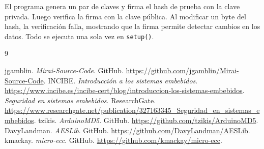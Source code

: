 \documentclass[12pt,a4paper]{article}
\begin{document}
El programa genera un par de claves y firma el hash de prueba con la clave privada. Luego verifica la firma con la clave pública. Al modificar un byte del hash, la verificación falla, mostrando que la firma permite detectar cambios en los datos. Todo se ejecuta una sola vez en \texttt{setup()}.


\newpage
\renewcommand{\refname}{Referencias}
\begin{thebibliography}{9}
 jgamblin. \textit{Mirai-Source-Code}. GitHub.
\url{https://github.com/jgamblin/Mirai-Source-Code}.
 INCIBE. \textit{Introducción a los sistemas embebidos}.
\url{https://www.incibe.es/incibe-cert/blog/introduccion-los-sistemas-embebidos}.
 \textit{Seguridad en sistemas embebidos}. ResearchGate.
\url{https://www.researchgate.net/publication/327163345_Seguridad_en_sistemas_embebidos}.
 tzikis. \textit{ArduinoMD5}. GitHub.
\url{https://github.com/tzikis/ArduinoMD5}.
 DavyLandman. \textit{AESLib}. GitHub.
\url{https://github.com/DavyLandman/AESLib}.
 kmackay. \textit{micro-ecc}. GitHub.
\url{https://github.com/kmackay/micro-ecc}.
\end{thebibliography}
\end{document}
